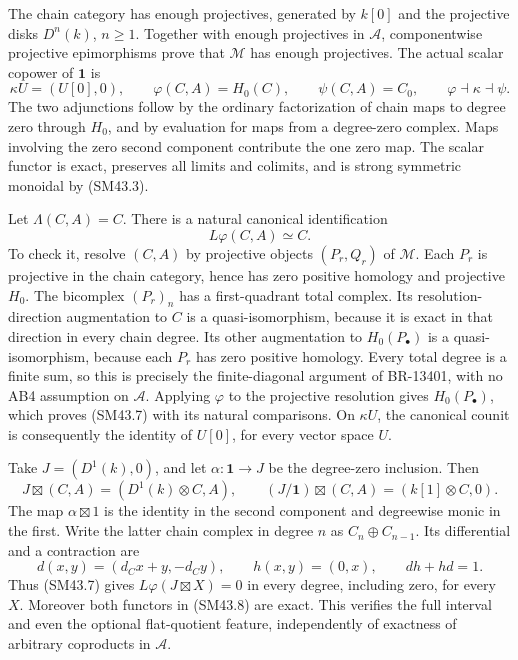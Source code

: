 The chain category has enough projectives, generated by
\(k[0]\) and the projective disks \(D^n(k)\), \(n\ge1\).
Together with enough projectives in \(\mathcal A\),
componentwise projective epimorphisms prove that
\(\mathcal M\) has enough projectives.
The actual scalar copower of \(\mathbf1\) is
\[
 \kappa U=(U[0],0),\qquad
 \varphi(C,A)=H_0(C),\qquad \psi(C,A)=C_0,
                   \qquad\varphi\dashv\kappa\dashv\psi.
                                                               \tag{SM43.6}
\]
The two adjunctions follow by the ordinary factorization of
chain maps to degree zero through \(H_0\), and by evaluation
for maps from a degree-zero complex.  Maps involving the zero
second component contribute the one zero map.  The scalar
functor is exact, preserves all limits and colimits, and is
strong symmetric monoidal by (SM43.3).

Let \(\Lambda(C,A)=C\).  There is a natural canonical
identification
\[
                  L\varphi(C,A)\simeq C.                    \tag{SM43.7}
\]
To check it, resolve \((C,A)\) by projective objects
\((P_r,Q_r)\) of \(\mathcal M\).  Each \(P_r\) is
projective in the chain category, hence has zero positive
homology and projective \(H_0\).  The bicomplex \((P_r)_n\)
has a first-quadrant total complex.  Its resolution-direction
augmentation to \(C\) is a quasi-isomorphism, because it is
exact in that direction in every chain degree.  Its other
augmentation to \(H_0(P_\bullet)\) is a quasi-isomorphism,
because each \(P_r\) has zero positive homology.  Every total
degree is a finite sum, so this is precisely the finite-diagonal
argument of BR-13401, with no AB4 assumption on
\(\mathcal A\).  Applying \(\varphi\) to the projective
resolution gives \(H_0(P_\bullet)\), which proves (SM43.7)
with its natural comparisons.  On \(\kappa U\), the canonical
counit is consequently the identity of \(U[0]\), for every
vector space \(U\).

Take \(J=(D^1(k),0)\), and let
\(\alpha:\mathbf1\to J\) be the degree-zero inclusion.
Then
\[
 J\boxtimes(C,A)=(D^1(k)\otimes C,A),\qquad
 (J/\mathbf1)\boxtimes(C,A)=(k[1]\otimes C,0).              \tag{SM43.8}
\]
The map \(\alpha\boxtimes1\) is the identity in the second
component and degreewise monic in the first.  Write the latter
chain complex in degree \(n\) as \(C_n\oplus C_{n-1}\).
Its differential and a contraction are
\[
 d(x,y)=(d_Cx+y,-d_Cy),\qquad h(x,y)=(0,x),
                     \qquad dh+hd=1.                         \tag{SM43.9}
\]
Thus (SM43.7) gives \(L\varphi(J\boxtimes X)=0\) in
every degree, including zero, for every \(X\).  Moreover both
functors in (SM43.8) are exact.  This verifies the full interval
and even the optional flat-quotient feature, independently of
exactness of arbitrary coproducts in \(\mathcal A\).

